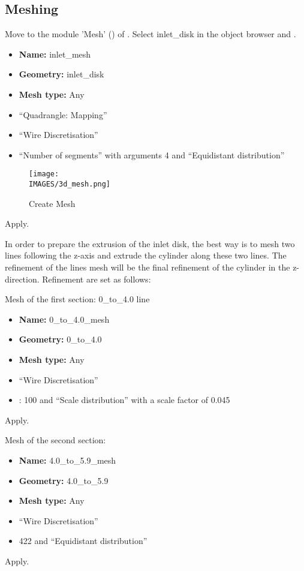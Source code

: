 \subsection{Meshing}
%
Move to the module 'Mesh' (\smesh) of \salome. Select inlet\_disk in the object browser and .
%
\begin{itemize}
	\item \textbf{Name:} inlet\_mesh
	\item \textbf{Geometry:} inlet\_disk
	\item \textbf{Mesh type:} Any
	\item {} ``Quadrangle: Mapping''
	\item {} ``Wire Discretisation''
	\item {} ``Number of segments'' with arguments 4 and ``Equidistant distribution''
\end{itemize}
%
\begin{figure}[H]
	\centering
	\texttt{[image: \\IMAGES/3d\_mesh.png]}
	\caption{Create Mesh}
	\label{lag:mesh_01}
\end{figure}
%
Apply.

In order to prepare the extrusion of the inlet disk, the best way is to mesh two lines following the z-axis and extrude the cylinder along these two lines. The refinement of the lines mesh will be the final refinement of the cylinder in the z-direction. Refinement are set as follows:

Mesh of the first section: 0\_to\_4.0 line
%
\begin{itemize}
	\item \textbf{Name:} 0\_to\_4.0\_mesh
	\item \textbf{Geometry:} 0\_to\_4.0
	\item \textbf{Mesh type:} Any
	\item {} ``Wire Discretisation''
	\item {}: 100 and ``Scale distribution'' with a scale factor of 0.045
\end{itemize}
%
Apply.

Mesh of the second section:
%
\begin{itemize}
	\item \textbf{Name:} 4.0\_to\_5.9\_mesh
	\item \textbf{Geometry:} 4.0\_to\_5.9
	\item \textbf{Mesh type:} Any
	\item {} ``Wire Discretisation''
	\item {} 422 and ``Equidistant distribution''
\end{itemize}
%
Apply.

